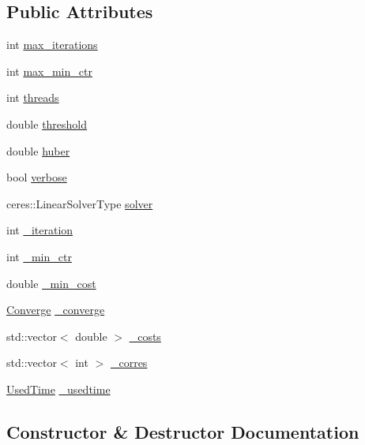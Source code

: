 \subsection*{Public Attributes}
\begin{DoxyCompactItemize}
\item 
int \hyperlink{structCommonParameters_a951b897db942a3b80f1f6ee880fcfae7}{max\+\_\+iterations}
\item 
int \hyperlink{structCommonParameters_a604bfa49bcd1852498e0ad3985a1d5e6}{max\+\_\+min\+\_\+ctr}
\item 
int \hyperlink{structCommonParameters_abed5578621c9e84ea56f079bb1c31d10}{threads}
\item 
double \hyperlink{structCommonParameters_ace212b0c9895dd12986c74c76c59656d}{threshold}
\item 
double \hyperlink{structCommonParameters_abe6a8b60c1a4b35f4dd5be1f273ebfa7}{huber}
\item 
bool \hyperlink{structCommonParameters_af92a01f74aa91c3cbd199fc4d6681d9b}{verbose}
\item 
ceres\+::\+Linear\+Solver\+Type \hyperlink{structCommonParameters_a7b71552fec0bb71d0ec6732af6e4bdc7}{solver}
\item 
int \hyperlink{structCommonParameters_ab10b6e5b633ab13a0748afeafab483f9}{\+\_\+iteration}
\item 
int \hyperlink{structCommonParameters_a2dc0f7569b6bf3d4c73cad48f7d5cb80}{\+\_\+min\+\_\+ctr}
\item 
double \hyperlink{structCommonParameters_a721e4b6c950cb648e185bed0398a4c46}{\+\_\+min\+\_\+cost}
\item 
\hyperlink{matcher_8h_a613ea35435bdcae2744bfe1fa55fa161}{Converge} \hyperlink{structCommonParameters_afbae46f09d3d4247cc10f6751a12e88e}{\+\_\+converge}
\item 
std\+::vector$<$ double $>$ \hyperlink{structCommonParameters_a3e8795d2e8b02816f28b38b62a0817c2}{\+\_\+costs}
\item 
std\+::vector$<$ int $>$ \hyperlink{structCommonParameters_a79197cd911dddf975eddecd693b5d3e3}{\+\_\+corres}
\item 
\hyperlink{structUsedTime}{Used\+Time} \hyperlink{structCommonParameters_a4efec37aa517458d904ec28f82d9c8fa}{\+\_\+usedtime}
\end{DoxyCompactItemize}


\subsection{Constructor \& Destructor Documentation}
\mbox{\label{structCommonParameters_a71957c669b007409960c318b14918b92}} 
